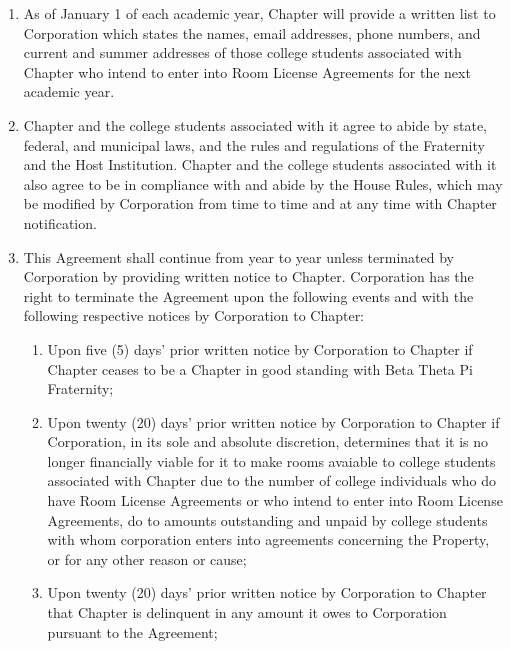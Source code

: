 \documentclass[12pt]{article}
\begin{document}
\begin{enumerate}
        \item As of January 1 of each academic year, Chapter will provide a written list to Corporation which states the names, email addresses, phone numbers, and current and summer addresses of those college students associated with Chapter who intend to enter into Room License Agreements for the next academic year.

        \item Chapter and the college students associated with it agree to abide by state, federal, and municipal laws, and the rules and regulations of the Fraternity and the Host Institution.
                Chapter and the college students associated with it also agree to be in compliance with and abide by the House Rules, which may be modified by Corporation from time to time and at any time with Chapter notification.

        \item This Agreement shall continue from year to year unless terminated by Corporation by providing written notice to Chapter.
                Corporation has the right to terminate the Agreement upon the following events and with the following respective notices by Corporation to Chapter:

                \begin{enumerate}[label=\alph*.]
                        \item Upon five (5) days' prior written notice by Corporation to Chapter if Chapter ceases to be a Chapter in good standing with Beta Theta Pi Fraternity;

                        \item Upon twenty (20) days' prior written notice by Corporation to Chapter if Corporation, in its sole and absolute discretion, determines that it is no longer financially viable for it to make rooms avaiable to college students associated with Chapter due to the number of college individuals who do have Room License Agreements or who intend to enter into Room License Agreements, do to amounts outstanding and unpaid by college students with whom corporation enters into agreements concerning the Property, or for any other reason or cause;

                        \item Upon twenty (20) days' prior written notice by Corporation to Chapter that Chapter is delinquent in any amount it owes to Corporation pursuant to the Agreement;
                \end{enumerate}


\end{enumerate}
\end{document}
